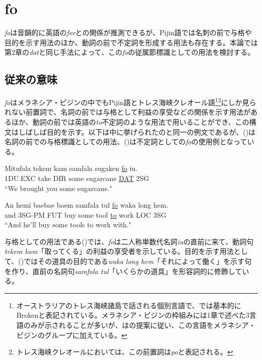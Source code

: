 \chapter{fo}
\textit{fo}は音韻的に英語の\textit{for}との関係が推測できるが、Pijin語では名刺の前で与格や目的を示す用法のほか、動詞の前で不定詞を形成する用法も存在する。本論では第2章の\textit{dat}と同じ手法によって、この\textit{fo}の従属節標識としての用法を検討する。

\section{従来の意味}\label{sec:originalfo}
\textit{fo}はメラネシア・ピジンの中でもPijin語とトレス海峡クレオール語\footnote{
\label{fn:broken}オーストラリアのトレス海峡諸島で話される個別言語で、\cite{prepositions}では基本的にBrokenと表記されている。メラネシア・ピジンの枠組みには1章で述べた3言語のみが示されることが多いが、\cite{prepositions}は\cite{keesing}の提案に従い、この言語をメラネシア・ピジンのグループに加えている。}\footnote{
トレス海峡クレオールにおいては、この前置詞は\textit{po}と表記される\citep{prepositions}。}にしか見られない前置詞で、名詞の前では与格として利益の享受などの関係を示す用法があるほか、動詞の前では英語の\textit{to}不定詞のような用法で用いることができ、この構文はしばしば目的を示す\citep{prepositions}。以下は\cite{prepositions}中に挙げられたのと同一の例文であるが、()は名詞の前での与格標識としての用法、()は不定詞としての\textit{fo}の使用例となっている。

\begin{exe}
\ex
\gll Mitufala tekem kam samfala sugaken \underline{fo} iu.\\
1DU.EXC take DIR some sugarcane \underline{DAT} 2SG\\
\glt ``We brought you some sugarcane." \cite[44]{rr2}

\ex\label{ex:fowaka}
\gll An hemi baebae baem samfala tul \underline{fo} waka long hem.\\
and 3SG-PM FUT buy some tool \underline{to} work LOC 3SG\\
\glt ``And he'll buy some tools to work with." \cite[270]{todd}
\end{exe}

与格としての用法である()では、\textit{fo}は二人称単数代名詞\textit{iu}の直前に来て、動詞句\textit{tekem kam}「取ってくる」の利益の享受者を示している。目的を示す用法として、()ではその道具の目的である\textit{waka long hem}「それによって働く」を示す句を作り、直前の名詞句\textit{samfala tul}「いくらかの道具」を形容詞的に修飾している。

